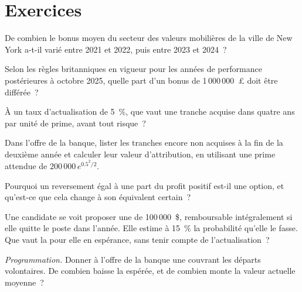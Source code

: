 \section{Exercices}

\begin{exercise}[$\star$]\label{exo:in:how-pay-works:1}
De combien le bonus moyen du secteur des valeurs mobilières de la ville de New York a-t-il varié entre 2021 et 2022, puis entre 2023 et 2024~?
\end{exercise}

\begin{exercise}[$\star$]\label{exo:in:how-pay-works:2}
Selon les règles britanniques en vigueur pour les années de performance postérieures à octobre 2025, quelle part d'un bonus de 1\,000\,000~£ doit
être différée~?
\end{exercise}

\begin{exercise}[$\star$]\label{exo:in:how-pay-works:3}
À un taux d'actualisation de 5~\%, que vaut une tranche acquise dans quatre ans par unité de prime, avant tout risque~?
\end{exercise}

\begin{exercise}[$\star\star$]\label{exo:in:how-pay-works:4}
Dans l'offre de la banque, lister les tranches encore non acquises à la fin de la deuxième année et calculer leur valeur d'attribution, en utilisant une
prime attendue de $200\,000\,e^{0.5^2/2}$.
\end{exercise}

\begin{exercise}[$\star\star$]\label{exo:in:how-pay-works:5}
Pourquoi un reversement égal à une part du profit positif est-il une option, et qu'est-ce que cela change à son équivalent certain~?
\end{exercise}

\begin{exercise}[$\star\star$]\label{exo:in:how-pay-works:6}
Une candidate se voit proposer une  de 100\,000~\$, remboursable intégralement si elle quitte le poste dans l'année. Elle estime à 15~\% la
probabilité qu'elle le fasse. Que vaut la  pour elle en espérance, sans tenir compte de l'actualisation~?
\end{exercise}

\begin{exercise}[$\star\star\star$]\label{exo:in:how-pay-works:7}
\emph{Programmation.} Donner à l'offre de la banque une  couvrant les départs volontaires. De combien baisse la
 espérée, et de combien monte la valeur actuelle moyenne~?
\end{exercise}

